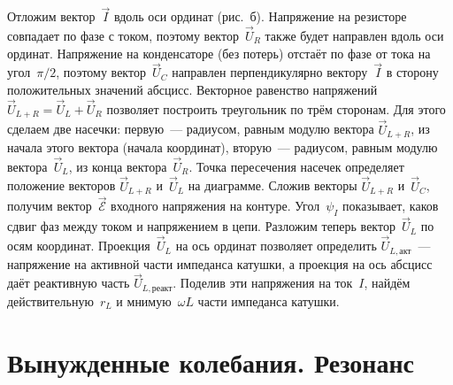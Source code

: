 Отложим вектор~$\vec I$ вдоль оси ординат (рис.~б). Напряжение на
резисторе совпадает по фазе с током, поэтому вектор~$\vec U_R$ также будет
направлен вдоль оси ординат. Напряжение на конденсаторе (без потерь) отстаёт по
фазе от тока на угол~$\pi/2$, поэтому вектор~$\vec U_C$ направлен
перпендикулярно вектору~$\vec I$ в сторону положительных значений абсцисс.
Векторное равенство напряжений $\vec U_{L+R}=\vec U_L+\vec U_R$ позволяет
построить треугольник по трём сторонам. Для этого сделаем две насечки:
первую~--- радиусом, равным модулю вектора $\vec U_{L+R}$, из начала этого
вектора (начала координат), вторую~--- радиусом, равным модулю вектора~$\vec
U_L$, из конца вектора~$\vec U_R$. Точка пересечения насечек определяет
положение векторов $\vec U_{L+R}$ и~$\vec U_L$ на диаграмме. Сложив векторы
$\vec{U}_{L+R}$ и~$\vec U_C$, получим вектор~$\vec{\mathcal{E}}$ входного
напряжения на контуре. Угол~$\psi_I$ показывает, каков сдвиг фаз между током и
напряжением в цепи. Разложим теперь вектор~$\vec U_L$ по осям координат.
Проекция~$\vec U_L$ на ось ординат позволяет определить $\vec
U_{L,\text{акт}}$~--- напряжение на активной части импеданса катушки, а проекция
на ось абсцисс даёт реактивную часть $\vec U_{L,\text{реакт}}$. Поделив эти
напряжения на ток~$I$, найдём действительную~$r_L$ и мнимую~$\omega L$ части
импеданса катушки.

\section{Вынужденные колебания. Резонанс}
